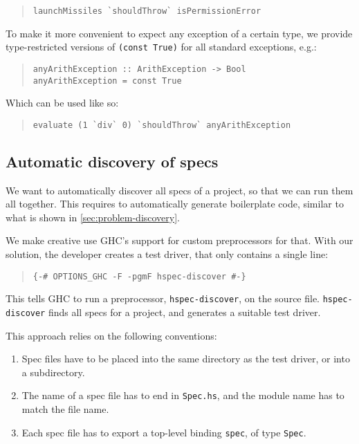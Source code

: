 \documentclass[preprint]{sigplanconf}
\begin{document}
\begin{quote}\small\begin{verbatim}
launchMissiles `shouldThrow` isPermissionError
\end{verbatim}\end{quote}

\noindent To make it more convenient to expect any exception of a
certain type, we provide type-restricted versions of {\tt (const
True)} for all standard exceptions, e.g.:

\begin{quote}\small\begin{verbatim}
anyArithException :: ArithException -> Bool
anyArithException = const True
\end{verbatim}\end{quote}

\noindent Which can be used like so:

\begin{quote}\small\begin{verbatim}
evaluate (1 `div` 0) `shouldThrow` anyArithException
\end{verbatim}\end{quote}


\subsection{Automatic discovery of specs}
\label{sec:solution-discovery}
We want to automatically discover all specs of a project, so that we
can run them all together.  This requires to automatically generate
boilerplate code, similar to what is shown in
\ref{sec:problem-discovery}.

We make creative use GHC's support for custom preprocessors for
that.  With our solution, the developer creates a test driver, that only
contains a single line:

\begin{quote}
\small
\begin{verbatim}
{-# OPTIONS_GHC -F -pgmF hspec-discover #-}
\end{verbatim}
\end{quote}

\noindent This tells GHC to run a preprocessor, \verb|hspec-discover|, on the
source file.  \verb|hspec-discover| finds all specs for a project, and
generates a suitable test driver.

This approach relies on the following conventions:
\begin{enumerate}
    \item
        Spec files have to be placed into the same directory as the
        test driver, or into a subdirectory.
    \item
        The name of a spec file has to end in \verb|Spec.hs|, and the
        module name has to match the file name.
    \item
        Each spec file has to export a top-level binding \verb|spec|,
        of type \verb|Spec|.
\end{enumerate}
\end{document}
